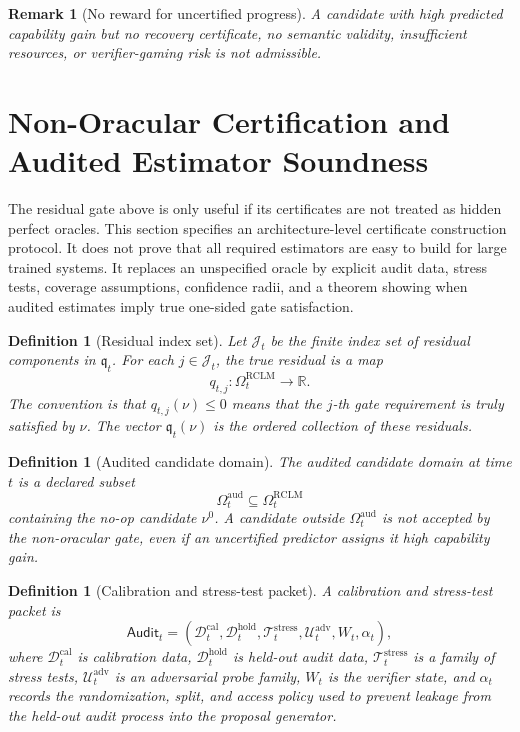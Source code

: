 \documentclass[11pt,a4paper]{article}
\newtheorem{definition}[theorem]{Definition}
\newtheorem{remark}[theorem]{Remark}
\newcommand{\Tcal}{\mathcal T}
\newcommand{\Dcal}{\mathcal D}
\newcommand{\Ucal}{\mathcal U}
\newcommand{\calib}{\mathrm{cal}}
\newcommand{\hold}{\mathrm{hold}}
\newcommand{\stress}{\mathrm{stress}}
\newcommand{\adv}{\mathrm{adv}}
\newcommand{\RCLM}{\mathrm{RCLM}}
\newcommand{\aud}{\mathrm{aud}}
\begin{document}
\begin{remark}[No reward for uncertified progress]
A candidate with high predicted capability gain but no recovery certificate, no semantic validity, insufficient resources, or verifier-gaming risk is not admissible.
\end{remark}


\section{Non-Oracular Certification and Audited Estimator Soundness}
\label{sec:non-oracular-certification}

The residual gate above is only useful if its certificates are not treated as hidden perfect oracles. This section specifies an architecture-level certificate construction protocol. It does not prove that all required estimators are easy to build for large trained systems. It replaces an unspecified oracle by explicit audit data, stress tests, coverage assumptions, confidence radii, and a theorem showing when audited estimates imply true one-sided gate satisfaction.

\begin{definition}[Residual index set]
\label{def:residual-index-set}
Let \(\mathcal J_t\) be the finite index set of residual components in \(\mathfrak q_t\). For each \(j\in\mathcal J_t\), the true residual is a map
\[
q_{t,j}:\Omega_t^{\RCLM}\to\mathbb R.
\]
The convention is that \(q_{t,j}(\nu)\le0\) means that the \(j\)-th gate requirement is truly satisfied by \(\nu\). The vector \(\mathfrak q_t(\nu)\) is the ordered collection of these residuals.
\end{definition}

\begin{definition}[Audited candidate domain]
\label{def:audited-candidate-domain}
The audited candidate domain at time \(t\) is a declared subset
\[
\Omega_t^{\aud}\subseteq\Omega_t^{\RCLM}
\]
containing the no-op candidate \(\nu^0\). A candidate outside \(\Omega_t^{\aud}\) is not accepted by the non-oracular gate, even if an uncertified predictor assigns it high capability gain.
\end{definition}

\begin{definition}[Calibration and stress-test packet]
\label{def:calibration-stress-packet}
A calibration and stress-test packet is
\[
\mathsf{Audit}_t
=
(\Dcal_t^{\calib},\Dcal_t^{\hold},\Tcal_t^{\stress},\Ucal_t^{\adv},W_t,\alpha_t),
\]
where \(\Dcal_t^{\calib}\) is calibration data, \(\Dcal_t^{\hold}\) is held-out audit data, \(\Tcal_t^{\stress}\) is a family of stress tests, \(\Ucal_t^{\adv}\) is an adversarial probe family, \(W_t\) is the verifier state, and \(\alpha_t\) records the randomization, split, and access policy used to prevent leakage from the held-out audit process into the proposal generator.
\end{definition}
\end{document}
